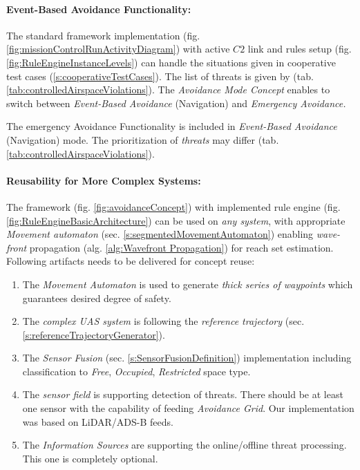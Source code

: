 \paragraph{Event-Based Avoidance Functionality:} The standard framework implementation (fig. \ref{fig:missionControlRunActivityDiagram}) with active $C2$ link and rules setup (fig. \ref{fig:RuleEngineInstanceLevels}) can handle the situations given in cooperative test cases (\ref{s:cooperativeTestCases}). The list of threats is given by (tab. \ref{tab:controlledAirspaceViolations}). The \emph{Avoidance Mode Concept} enables to switch between \emph{Event-Based Avoidance} (Navigation) and \emph{Emergency Avoidance.}
\begin{note}
    The emergency Avoidance Functionality is included in \emph{Event-Based Avoidance} (Navigation) mode.
    The prioritization of \emph{threats} may differ (tab. \ref{tab:controlledAirspaceViolations}).
\end{note}

\paragraph{Reusability for More Complex Systems:} The framework (fig. \ref{fig:avoidanceConcept}) with implemented rule engine (fig. \ref{fig:RuleEngineBasicArchitecture}) can be used on \emph{any system}, with appropriate \emph{Movement automaton} (sec. \ref{s:segmentedMovementAutomaton}) enabling \emph{wave-front} propagation (alg. \ref{alg:Wavefront Propagation}) for reach set estimation. Following artifacts needs to be delivered for concept reuse:

\begin{enumerate}
    \item The \emph{Movement Automaton} is used to generate \emph{thick series of waypoints} which guarantees desired degree of safety.
    
    \item The \emph{complex UAS system} is following the \emph{reference trajectory} (sec. \ref{s:referenceTrajectoryGenerator}).
    
    \item The \emph{Sensor Fusion} (sec. \ref{s:SensorFusionDefinition}) implementation including classification to \emph{Free}, \emph{Occupied}, \emph{Restricted} space type.
    
    \item The \emph{sensor field} is supporting detection of threats. There should be at least one sensor with the capability of feeding \emph{Avoidance Grid}. Our implementation was based on LiDAR/ADS-B feeds.
    
    \item The \emph{Information Sources} are supporting the online/offline threat processing. This one is completely optional.
\end{enumerate}

